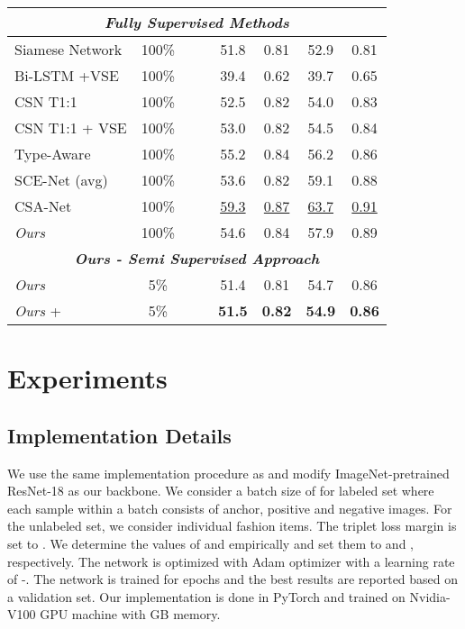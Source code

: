 \documentclass[sigconf]{acmart}
\newcommand{\cmark}{\color{red}{}}
\newcommand{\xmark}{\color{algoGreen}}
\begin{document}
\begin{table*}[t]
{\begin{tabular}{l|ccc|cc|cc}
        \hline
        \multicolumn{8}{c}{\textit{\textbf{Fully Supervised Methods}}} \\
        \hline 
        Siamese Network \cite{eccv2018learning} & {\color{red}100\%} & \xmark & \xmark  & 51.8 & 0.81& 52.9 & 0.81 \\
        Bi-LSTM +VSE \cite{bilstm} & {\color{red}100\%} & \cmark & \xmark  & 39.4 & 0.62& 39.7 & 0.65 \\
        CSN T1:1 \cite{csn} & {\color{red}100\%} & \xmark & \cmark & 52.5 & 0.82 & 54.0 & 0.83 \\
        CSN T1:1 + VSE \cite{csn} & {\color{red}100\%} & \cmark & \cmark  & 53.0 & 0.82 & 54.5 & 0.84 \\
        Type-Aware \cite{eccv2018learning} & {\color{red}100\%} & \cmark & \cmark  & 55.2 & 0.84 & 56.2 & 0.86 \\
        SCE-Net (avg) \cite{iccv2019learning}  & {\color{red}100\%} & \cmark & \xmark & 53.6 & 0.82  & 59.1 & 0.88 \\
        CSA-Net \cite{cvpr2020fashion}  & {\color{red}100\%} & \xmark & \cmark & \underline{59.3} & \underline{0.87} & \underline{63.7} & \underline{0.91} \\
        
        \textit{Ours} & {\color{red}100\%} & \xmark & \xmark  & 54.6 & 0.84 & 57.9 & 0.89 \\
  \hline \multicolumn{8}{c}{\textit{\textbf{Ours - Semi Supervised Approach}}} \\
  \hline 
    \textit{Ours} & {\color{algoGreen}5\%} & \xmark & \xmark  & 51.4 & 0.81 & 54.7 & 0.86 \\
    \textit{Ours} +  & {\color{algoGreen}5\%} & \xmark & \xmark  & \textbf{51.5} & \textbf{0.82} & \textbf{54.9} & \textbf{0.86} \\
    \hline 
    \end{tabular}
    }
    \label{tab:main}
\end{table*}
 
\section{Experiments}

\subsection{Implementation Details}
\label{sec:impl}
We use the same implementation procedure as \cite{iccv2019learning, eccv2018learning} and modify ImageNet-pretrained ResNet-18 \cite{resnet} as our backbone. We consider a batch size of  for labeled set where each sample within a batch consists of anchor, positive and negative images. For the unlabeled set, we consider  individual fashion items. The triplet loss margin  is set to . We determine the values of  and  empirically and set them to  and , respectively. The network is optimized with Adam \cite{kingma2014adam} optimizer with a learning rate of -. The network is trained for  epochs and the best results are reported based on a validation set. Our implementation is done in PyTorch \cite{paszke2019pytorch} and trained on Nvidia-V100 GPU machine with GB memory.
\end{document}
